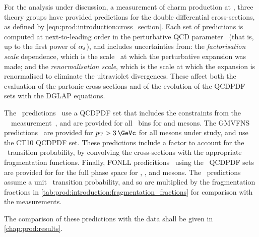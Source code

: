 For the analysis under discussion, a measurement of charm production at 
, three theory groups have provided predictions for the double 
differential cross-sections, as defined by 
\cref{eqn:prod:introduction:cross_section}.
Each set of predictions is computed at next-to-leading order in the 
perturbative \ac{QCD} parameter \alphas\ (that is, up to the first power of 
$\alpha_{s}$), and includes uncertainties from: the \emph{factorisation scale} 
dependence, which is the scale \pdfqsquared\ at which the perturbative 
expansion was made; and the \emph{renormalisation scale}, which is the scale at 
which the expansion is renormalised to eliminate the ultraviolet divergences.
These affect both the evaluation of the partonic cross-sections and of the 
evolution of the \ac{QCDPDF} sets with the \ac{DGLAP} equations.

The \nnpdfl\ predictions~\cite{Gauld:2015yia} use a \ac{QCDPDF} set that 
includes the constraints from the \ \lhcb\ 
measurement~\cite{LHCb-PAPER-2012-041}, and are provided for all \pTy\ bins for 
\PDz and \PDp mesons.
The \ac{GMVFNS} predictions~\cite{Kniehl:2012ti} are provided for $\pT > 
\SI{3}{\GeVc}$ for all mesons under study, and use the CT10 \ac{QCDPDF} set.
These predictions include a factor to account for the \cToHc\ transition 
probability, by convolving the \decay{\ccbar}{\PHc} cross-sections with the 
appropriate fragmentation functions.
Finally, \ac{FONLL} predicitions~\cite{Cacciari:2015fta} using the \nnpdf\ 
\ac{QCDPDF} sets are provided for for the full \pTy phase space for \PDz, \PDp, 
and \PDstarp mesons.
The \fonll\ predictions assume a unit \cToHc\ transition probability, and so 
are multiplied by the fragmentation fractions in 
\cref{tab:prod:introduction:fragmentation_fractions} for comparison with the 
measurements.

The comparison of these predictions with the data shall be given in 
\cref{chap:prod:results}.

